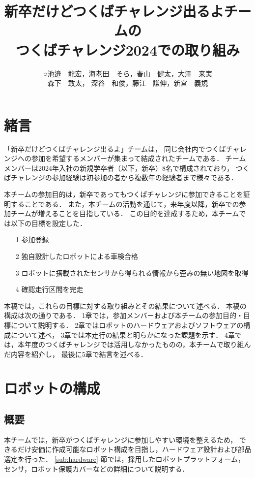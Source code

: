 \documentclass[twocolumn,9pt]{jsproceedings}
\title{新卒だけどつくばチャレンジ出るよチームの\\つくばチャレンジ2024での取り組み}
\author{○池邉　龍宏\authorrefmark{1}，海老田　そら\authorrefmark{1}，春山　健太\authorrefmark{1}，大澤　来実\authorrefmark{1}\\森下　敢太\authorrefmark{1}，
深谷　和俊\authorrefmark{1}，藤江　謙伸\authorrefmark{1}，新宮　義規\authorrefmark{1}}
\affiliation{新卒だけどつくばチャレンジ出るよ}
\begin{document}
\maketitle


\section{緒言}\label{sec:1}

「新卒だけどつくばチャレンジ出るよ」チームは，
同じ会社内でつくばチャレンジへの参加を希望するメンバーが集まって結成されたチームである．
チームメンバーは2024年入社の新規学卒者（以下，新卒）8名で構成されており，
つくばチャレンジの参加経験は初参加の者から複数年の経験者まで様々である．

本チームの参加目的は，新卒であってもつくばチャレンジに参加できることを証明することである．
また，本チームの活動を通じて，来年度以降，新卒での参加チームが増えることを目指している．
この目的を達成するため，本チームでは以下の目標を設定した．
\begin{itemize}
  \item[1] 参加登録
  \item[2] 独自設計したロボットによる車検合格
  \item[3] ロボットに搭載されたセンサから得られる情報から歪みの無い地図を取得
  \item[4] 確認走行区間を完走
\end{itemize}


本稿では，これらの目標に対する取り組みとその結果について述べる．
本稿の構成は次の通りである．
1章では，参加メンバーおよび本チームの参加目的・目標について説明する．
2章ではロボットのハードウェアおよびソフトウェアの構成について述べ，
3章では本走行の結果と明らかになった課題を示す．
4章では，本年度のつくばチャレンジでは活用しなかったものの，本チームで取り組んだ内容を紹介し，
最後に5章で結言を述べる．

\section{ロボットの構成}

\subsection{概要}
本チームでは，新卒がつくばチャレンジに参加しやすい環境を整えるため，
できるだけ安価に作成可能なロボット構成を目指し，ハードウェア設計および部品選定を行った．
\ref{sub:hardware} 節では，採用したロボットプラットフォーム，センサ，ロボット保護カバーなどの詳細について説明する．
\end{document}
